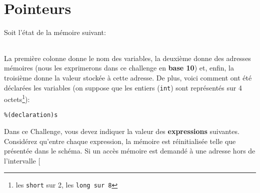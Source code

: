 \documentclass[12pt]{article}
\begin{document}
\lstset{style=CStyle}

\section{Pointeurs}

Soit l'état de la mémoire suivant:

\begin{table}[!htbp]
  \centering
  \begin{tabular}{ll|l|}
  \end{tabular}
\end{table}

La première colonne donne le nom des variables, la deuxième donne des adresses
mémoires (nous les exprimerons dans ce challenge en \textbf{base 10}) et, enfin,
la troisième donne la valeur stockée à cette adresse. De plus, voici comment ont été déclarées les variables (on suppose que les entiers (\texttt{int}) sont représentés sur 4
octets\footnote{les \texttt{short} sur 2, les \texttt{long sur 8}}):

\begin{lstlisting}
%(declaration)s
\end{lstlisting}

Dans ce Challenge, vous devez indiquer la valeur des \textbf{expressions}
suivantes. Considérez qu'entre chaque expression, la mémoire est réinitialisée
telle que présentée dans le schéma. Si un accès mémoire est demandé à une
adresse hors de l'intervalle [%

\newpage

\begin{enumerate}

\end{enumerate}
\end{document}
